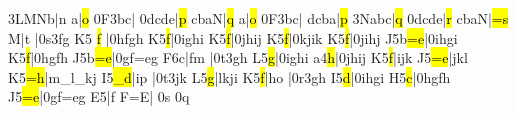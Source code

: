 \temps\notes\qqb3LMNb|\hu n\enotes
\barre\notes{}\ql a\sk|\hl o\enotes
\temps\notes\Ilegl0F\dqb3bc|\enotes
\temps\notes\qqb0dcde|\hl p\enotes
%
\def\interfacteur{12}%
\alaligne\noteskipLARGE\nspace\notes{}cbaN|\hl q\enotes
\temps\notes{}\ql a\sk|\hl o\enotes
\temps\notes\Ilegl0F\dqb3bc|\enotes
\barre\notes{}dcba|\hl p\enotes
\temps\notes\qqb3Nabc|\hl q\enotes
\barre\notes\qqb0dcde|\hl r\enotes
\temps\notes\soufflcr{}cbaN|\hl{=s}\enotes
\barre\nspace\notes{}\ql M|\ql t\cbreath\enotes
\zalapage\noteskipLarge\notes{}\soupir|\Ilegu0s\dsoqb3fg\enotes
\temps\arpg K5\relax
\notes {}\hl f\relax
   |\qsoqb0hfgh\enotes
\barre\arpg K5\notes{}\hl f|\qsoqb0ighi\enotes
\temps\arpg K5\notes{}\hl f|\qsoqb0jhij\enotes
\barre\arpg K5\notes{}\hl f|\qsoqb0kjik\enotes
\temps\arpg K5\notes{}\hl f|\qsoqb0jihj\enotes
\barre\Arpg J5\notes{}\lh b\hl{=e}|\qsoqb0ihgi\enotes
\temps\arpg K5\notes{}\hl f|\qsoqb0hgfh\enotes
\alaligne\Arpg J5\notes{}\lh b\hl{=e}|\qsoqb0gf{=e}g\enotes
\temps\arpg F6\notes{}\ql c|\zq f\ql m\sk\enotes
\notes\soupir|\Ilegu0t\dsoqb3gh\enotes
\barre\Arpg L5\notes{}\hl g|\qsoqb0ighi\enotes
\temps\arpg a4\notes{}\hl h|\qsoqb0jhij\enotes
\barre\Arpg K5\notes{}\hl f|ijk\enotes
\temps\Arpg J5\notes{}\hl{=e}|jkl\enotes
\barre\Arpg K5\notes{}\hl{=h}|m{_l}{_k}j\enotes
\temps\Arpg I5\notes{}\hl{_d}\sk|\zq i\ql p\enotes
\temps\notes|\Ilegu0t\dsoqb3jk\enotes
\advancebottom{\Interligne}\relax
\alaligne\Arpg L5\notes{}\hl g|lkji\enotes
\temps\arpg K5\notes{}\hl f\sk|\zq h\ql o\enotes
\temps\notes|\Ilegu0r\dsoqb3gh\enotes
\barre\arpg I5\notes{}\hl d|\qsoqb0ihgi\enotes
\temps\arpg H5\notes{}\hl c|\qsoqb0hgfh\enotes
\def\sfql#1{\usf{#1}\ql{#1}}%
\barre\Arpg J5\notes\soufflcr{}\hl{=e}|\qsoqb0gf{=e}g\enotes
\temps\arpg E5\notes{}\sfql a\sk|\zq f\sfql m\enotes
\temps\notes{}F{=E}|\relax
  \ifx\mxversion\undefined\Ilegu0s\relax
  \else\Ilegu0q\relax
